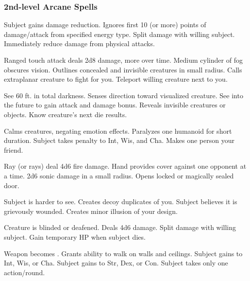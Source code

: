 \subsubsection{2nd-level Arcane Spells} 
\begin{swspelllist}
     Subject gains damage reduction.
     Ignores first 10 (or more) points of damage/attack from specified energy type.
     Split damage with willing subject.
     Immediately reduce damage from physical attacks.

     Ranged touch attack deals 2d8 damage, more over time.
     Medium cylinder of fog obscures vision.
     Outlines concealed and invisible creatures in small radius.
     Calls extraplanar creature to fight for you.
     Teleport willing creature next to you.

     See 60 ft. in total darkness.
     Senses direction toward visualized creature.
     See into the future to gain attack and damage bonus.
     Reveals invisible creatures or objects.
     Know creature's next die results.

     Calms creatures, negating emotion effects.
     Paralyzes one humanoid for short duration.
     Subject takes  penalty to Int, Wis, and Cha.
     Makes one person your friend.

     Ray (or rays) deal 4d6 fire damage.
     Hand provides cover against one opponent at a time.
     2d6 sonic damage in a small radius.
     Opens locked or magically sealed door.

     Subject is harder to see.
     Creates decoy duplicates of you.
     Subject believes it is grievously wounded.
     Creates minor illusion of your design.

     Creature is blinded or deafened.
     Deals 4d6 damage.
     Split damage with willing subject.
     Gain temporary HP when subject dies.

     Weapon becomes .
     Grants ability to walk on walls and ceilings.
     Subject gains  to Int, Wis, or Cha.
     Subject gains  to Str, Dex, or Con.
     Subject takes only one action/round.
\end{swspelllist}


